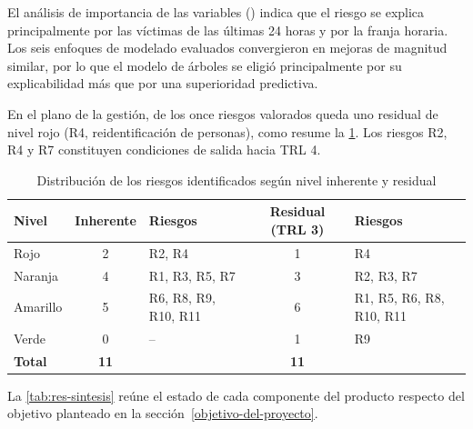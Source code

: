El análisis de importancia de las variables () indica que el riesgo se explica principalmente por las víctimas de las últimas 24 horas y por la franja horaria. Los seis enfoques de modelado evaluados convergieron en mejoras de magnitud similar, por lo que el modelo de árboles se eligió principalmente por su explicabilidad más que por una superioridad predictiva.

En el plano de la gestión, de los once riesgos valorados queda uno residual de nivel rojo (R4, reidentificación de personas), como resume la \cref{tab:res-riesgos}. Los riesgos R2, R4 y R7 constituyen condiciones de salida hacia TRL 4.

\begin{table}[htbp]
\centering
\caption{Distribución de los riesgos identificados según nivel inherente y residual}
\label{tab:res-riesgos}
\begin{tabularx}{\linewidth}{@{}lc>{\raggedright\arraybackslash}Xc>{\raggedright\arraybackslash}X@{}}
\toprule
\textbf{Nivel} & \textbf{Inherente} & \textbf{Riesgos} & \textbf{Residual (TRL 3)} & \textbf{Riesgos} \\
\midrule
Rojo & 2 & R2, R4 & 1 & R4 \\
Naranja & 4 & R1, R3, R5, R7 & 3 & R2, R3, R7 \\
Amarillo & 5 & R6, R8, R9, R10, R11 & 6 & R1, R5, R6, R8, R10, R11 \\
Verde & 0 & -- & 1 & R9 \\
\midrule
\textbf{Total} & \textbf{11} & & \textbf{11} & \\
\bottomrule
\end{tabularx}
\end{table}

La \cref{tab:res-sintesis} reúne el estado de cada componente del producto respecto del objetivo planteado en la sección~\ref{objetivo-del-proyecto}.

